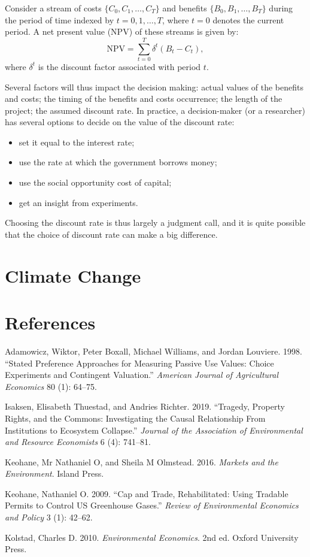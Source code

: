 \documentclass[
]{book}
\providecommand{\tightlist}{%
  \setlength{\itemsep}{0pt}\setlength{\parskip}{0pt}}
\begin{document}
Consider a stream of costs \(\{C_0,C_1,\ldots,C_T\}\) and benefits \(\{B_0,B_1,\ldots,B_T\}\) during the period of time indexed by \(t=0,1,\ldots,T\), where \(t=0\) denotes the current period.
A net present value (NPV) of these streams is given by:
\[\text{NPV} = \sum_{t=0}^{T}\delta^t\left(B_t-C_t\right),\]
where \(\delta^t\) is the discount factor associated with period \(t\).

Several factors will thus impact the decision making: actual values of the benefits and costs; the timing of the benefits and costs occurrence; the length of the project; the assumed discount rate. In practice, a decision-maker (or a researcher) has several options to decide on the value of the discount rate:

\begin{itemize}
\tightlist
\item
  set it equal to the interest rate;
\item
  use the rate at which the government borrows money;
\item
  use the social opportunity cost of capital;
\item
  get an insight from experiments.
\end{itemize}

Choosing the discount rate is thus largely a judgment call, and it is quite possible that the choice of discount rate can make a big difference.

\hypertarget{climate-change}{%
\chapter{Climate Change}\label{climate-change}}

\hypertarget{references}{%
\chapter*{References}\label{references}}

\hypertarget{refs}{}
\leavevmode\hypertarget{ref-adamowicz1998}{}%
Adamowicz, Wiktor, Peter Boxall, Michael Williams, and Jordan Louviere. 1998. ``Stated Preference Approaches for Measuring Passive Use Values: Choice Experiments and Contingent Valuation.'' \emph{American Journal of Agricultural Economics} 80 (1): 64--75.

\leavevmode\hypertarget{ref-isaksen2019}{}%
Isaksen, Elisabeth Thuestad, and Andries Richter. 2019. ``Tragedy, Property Rights, and the Commons: Investigating the Causal Relationship From Institutions to Ecosystem Collapse.'' \emph{Journal of the Association of Environmental and Resource Economists} 6 (4): 741--81.

\leavevmode\hypertarget{ref-keohane2016}{}%
Keohane, Mr Nathaniel O, and Sheila M Olmstead. 2016. \emph{Markets and the Environment}. Island Press.

\leavevmode\hypertarget{ref-keohane2009}{}%
Keohane, Nathaniel O. 2009. ``Cap and Trade, Rehabilitated: Using Tradable Permits to Control US Greenhouse Gases.'' \emph{Review of Environmental Economics and Policy} 3 (1): 42--62.

\leavevmode\hypertarget{ref-kolstad2010}{}%
Kolstad, Charles D. 2010. \emph{Environmental Economics}. 2nd ed. Oxford University Press.
\end{document}
